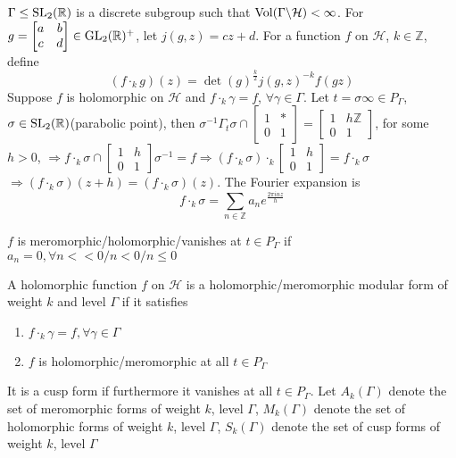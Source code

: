 \documentclass[main]{subfiles}
\begin{document}
$\Gamma\leq \operatorname{SL}_2(\mathbb R)$ is a discrete subgroup such that $\operatorname{Vol}(\Gamma\backslash\mathcal H)<\infty$. For $g=\begin{bmatrix}
a&b\\
c&d
\end{bmatrix}\in\operatorname{GL}_2(\mathbb R)^+$, let $j(g,z)=cz+d$. For a function $f$ on $\mathcal H$, $k\in\mathbb Z$, define
\[(f\cdot_k g)(z)=\det(g)^{\frac{k}{2}}j(g,z)^{-k}f(gz)\]
Suppose $f$ is holomorphic on $\mathcal H$ and $f\cdot_k\gamma=f$, $\forall\gamma\in\Gamma$. Let $t=\sigma\infty\in P_\Gamma$, $\sigma\in\operatorname{SL}_2(\mathbb R)$(parabolic point), then $\sigma^{-1}\Gamma_t\sigma\cap\begin{bmatrix}
1&* \\
0&1
\end{bmatrix}=\begin{bmatrix}
1&h\mathbb Z\\
0&1
\end{bmatrix}$, for some $h>0$, $\Rightarrow f\cdot_k\sigma\cap\begin{bmatrix}
1&h \\
0&1
\end{bmatrix}\sigma^{-1}=f\Rightarrow(f\cdot_k\sigma)\cdot_k\begin{bmatrix}
1&h \\
0&1
\end{bmatrix}=f\cdot_k\sigma$ $\Rightarrow (f\cdot_k\sigma)(z+h)=(f\cdot_k\sigma)(z)$. The Fourier expansion is
\[f\cdot_k\sigma=\sum_{n\in\mathbb Z}a_ne^{\frac{2\pi inz}{h}}\]

\begin{definition}
$f$ is meromorphic/holomorphic/vanishes at $t\in P_\Gamma$ if $a_n=0,\forall n<<0/n<0/n\leq0$
\end{definition}

\begin{definition}
A holomorphic function $f$ on $\mathcal H$ is a holomorphic/meromorphic modular form of weight $k$ and level $\Gamma$ if it satisfies
\begin{enumerate}
\item $f\cdot_k\gamma=f,\forall\gamma\in\Gamma$
\item $f$ is holomorphic/meromorphic at all $t\in P_\Gamma$
\end{enumerate}
It is a cusp form if furthermore it vanishes at all $t\in P_\Gamma$. Let $A_k(\Gamma)$ denote the set of meromorphic forms of weight $k$, level $\Gamma$, $M_k(\Gamma)$ denote the set of holomorphic forms of weight $k$, level $\Gamma$, $S_k(\Gamma)$ denote the set of cusp forms of weight $k$, level $\Gamma$
\end{definition}
\end{document}
